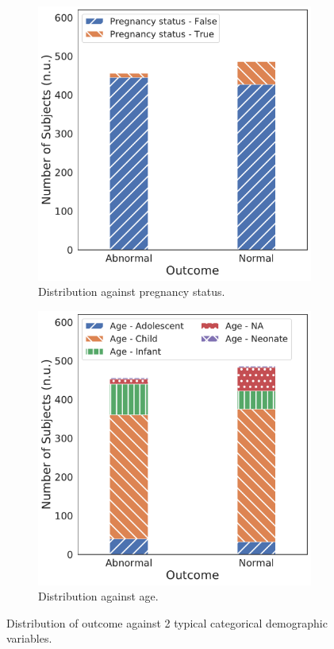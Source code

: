 \begin{figure}[!htp]
\centering
\begin{subfigure}[t]{0.49\linewidth}
    \centering
    \includegraphics[width=\textwidth]{images/outcome_pregnancy_status_corr.pdf}
    \caption[]
    {Distribution against pregnancy status.}
    \label{fig:outcome_pregnancy_status_corr}
\end{subfigure}
\hfill
\begin{subfigure}[t]{0.49\linewidth}
    \centering
    \includegraphics[width=\textwidth]{images/outcome_age_corr.pdf}
    \caption[]
    {Distribution against age.}
    \label{fig:outcome_age_corr}
\end{subfigure}
\caption[]
{Distribution of outcome against 2 typical categorical demographic variables.}
\label{fig:outcome_corr}
\end{figure}
